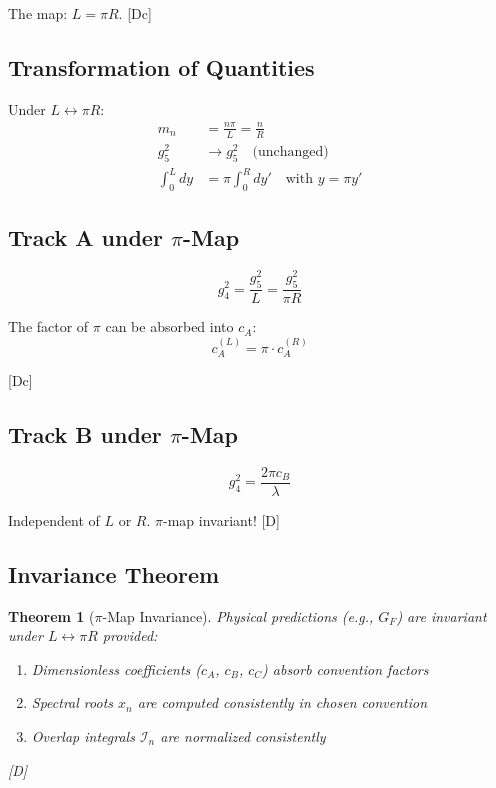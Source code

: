 \documentclass[11pt,a4paper]{article}
\newtheorem{theorem}{Theorem}[section]
\newcommand{\tagD}{\textcolor{blue!70!black}{[D]}}
\newcommand{\tagDc}{\textcolor{blue!50!black}{[Dc]}}
\begin{document}
The map: $L = \pi R$. \tagDc

\subsection{Transformation of Quantities}

Under $L \leftrightarrow \pi R$:
\begin{align}
\label{eq:map-mn}
m_n &= \frac{n\pi}{L} = \frac{n}{R} \\
\label{eq:map-g5}
g_5^2 &\to g_5^2 \quad \text{(unchanged)} \\
\label{eq:map-integral}
\int_0^L dy &= \pi \int_0^R dy' \quad \text{with } y = \pi y'
\end{align}

\subsection{Track A under $\pi$-Map}

\begin{equation}
\label{eq:track-a-pimap}
g_4^2 = \frac{g_5^2}{L} = \frac{g_5^2}{\pi R}
\end{equation}

The factor of $\pi$ can be absorbed into $c_A$:
\begin{equation}
\label{eq:track-a-pimap-2}
c_A^{(L)} = \pi \cdot c_A^{(R)}
\end{equation}

\tagDc

\subsection{Track B under $\pi$-Map}

\begin{equation}
\label{eq:track-b-pimap}
g_4^2 = \frac{2\pi c_B}{\lambda}
\end{equation}

Independent of $L$ or $R$. $\pi$-map invariant! \tagD

\subsection{Invariance Theorem}

\begin{theorem}[$\pi$-Map Invariance]
\label{thm:pi-map}
Physical predictions (e.g., $G_F$) are invariant under $L \leftrightarrow \pi R$
provided:
\begin{enumerate}
    \item Dimensionless coefficients ($c_A$, $c_B$, $c_C$) absorb convention factors
    \item Spectral roots $x_n$ are computed consistently in chosen convention
    \item Overlap integrals $\mathcal{I}_n$ are normalized consistently
\end{enumerate}
\tagD
\end{theorem}
\end{document}
